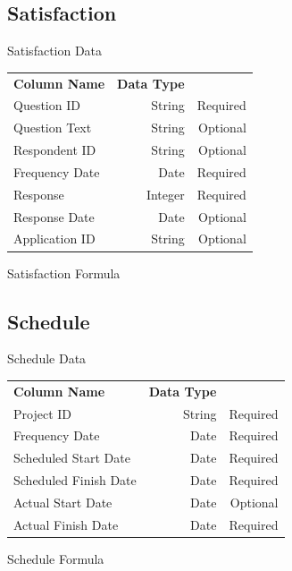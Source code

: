     \subsection{Satisfaction}
        \begin{frame}{Satisfaction Data}
            \centering
            \begin{tabular}{l | r | r}
                {\bfseries Column Name}
                 & {\bfseries Data Type}
                 &  \\
                
                Question ID & String  & Required \\
                \myrowcolour%
                Question Text & String  & Optional \\
                Respondent ID & String & Optional \\
                \myrowcolour%
                Frequency Date & Date & Required \\
                Response & Integer & Required \\
                \myrowcolour%
                Response Date & Date & Optional \\
                Application ID & String & Optional \\
            \end{tabular}
        \end{frame} 
        \begin{frame}{Satisfaction Formula }
        \end{frame} 
    \subsection{Schedule}
        \begin{frame}{Schedule Data}
            \centering
            \begin{tabular}{l | r | r}
                {\bfseries Column Name}
                 & {\bfseries Data Type}
                 &  \\
                
                Project ID & String  & Required \\
                \myrowcolour%
                Frequency Date & Date & Required \\
                Scheduled Start Date & Date & Required \\
                \myrowcolour%
                Scheduled Finish Date & Date & Required \\
                Actual Start Date & Date  & Optional \\
                \myrowcolour%
                Actual Finish Date & Date  & Required \\
            \end{tabular}
        \end{frame} 
        \begin{frame}{Schedule Formula }
        \end{frame} 
